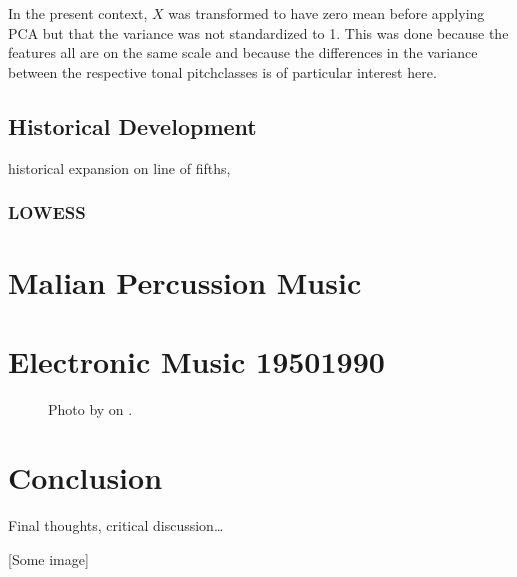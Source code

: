 \documentclass[letterpaper,10pt,english]{sphinxmanual}
\begin{document}
In the present context, \(X\) was transformed to have zero mean before applying PCA
but that the variance was not standardized to 1.
This was done because the features all are on the same scale and because the
differences in the variance between the respective tonal pitch\sphinxhyphen{}classes is of particular
interest here.


\section{Historical Development}
\label{\detokenize{tonality:historical-development}}
historical expansion on line of fifths,


\subsection{LOWESS}
\label{\detokenize{tonality:lowess}}

\chapter{Malian Percussion Music}
\label{\detokenize{mali_percussion:malian-percussion-music}}\label{\detokenize{mali_percussion::doc}}

\chapter{Electronic Music 1950\sphinxhyphen{}1990}
\label{\detokenize{electronic:electronic-music-1950-1990}}\label{\detokenize{electronic::doc}}
\begin{figure}[htbp]
\centering
\capstart

\noindent{}
\caption{Photo by 
on .}\label{\detokenize{electronic:id1}}\end{figure}


\chapter{Conclusion}
\label{\detokenize{conclusion:conclusion}}\label{\detokenize{conclusion::doc}}
Final thoughts, critical discussion…

{[}Some image{]}
\end{document}
